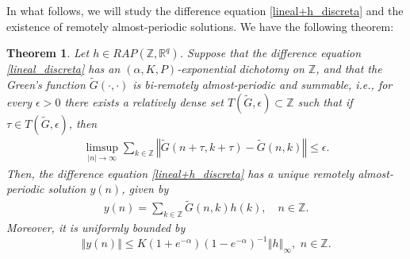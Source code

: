 \documentclass[english,,reqno]{amsart}
\numberwithin{equation}{section}
\newcommand{\bb}[1]{\mathbb{#1}}
\theoremstyle{plain}
\newtheorem{thm}{Theorem}[section]
\theoremstyle{definition}
\theoremstyle{remark}
\begin{document}
In what follows, we will study the difference equation \eqref{lineal+h_discreta} and the existence of remotely almost-periodic solutions. We have the following theorem:

\begin{thm}\label{difference_sol_bounded}
Let $h \in RAP(\mathbb{Z}, \mathbb{R}^q)$.  
Suppose that the difference equation \eqref{lineal_discreta}  
has an $(\alpha, K, P)$-exponential dichotomy on $\mathbb{Z}$, and that the Green's function $\tilde{G}(\cdot,\cdot)$ is bi-remotely almost-periodic and summable, i.e., for every $\epsilon > 0$ there exists a relatively dense set $T(\tilde{G}, \epsilon) \subset \mathbb{Z}$ such that if $\tau \in T(\tilde{G}, \epsilon)$, then  
\begin{eqnarray}
\limsup_{|n| \rightarrow \infty} \sum_{k \in \mathbb{Z}} \left\Vert \tilde{G}(n+\tau, k+\tau) - \tilde{G}(n,k) \right\Vert \leq \epsilon. \label{bi_sumable}
\end{eqnarray}  
Then, the difference equation \eqref{lineal+h_discreta} has a unique remotely almost-periodic solution $y(n)$, given by  
\begin{eqnarray*}
y(n) = \sum_{k \in \mathbb{Z}} \tilde{G}(n,k)h(k), \quad n \in \mathbb{Z}.
\end{eqnarray*}  
Moreover, it is uniformly bounded by
\[
\left\Vert y\left(n\right)\right\Vert \leq K\left(1+e^{-\alpha}\right)\left(1-e^{-\alpha}\right)^{-1}\left\Vert h\right\Vert_{\infty},\, \, n\in \bb{Z}.
\]
\end{thm}
\end{document}
